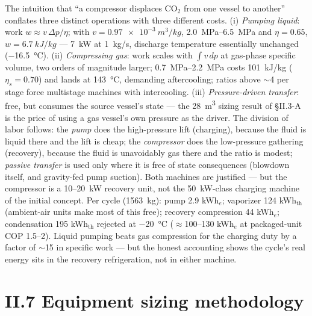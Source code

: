 The intuition that ``a compressor displaces CO$_2$ from one vessel to
another'' conflates three distinct operations with three different
costs. (i) \emph{Pumping liquid}: work
$w \approx v\,\Delta p/\eta$; with
$v = \SI{0.97e-3}{m^3/kg}$, \SIrange{2.0}{6.5}{MPa} and
$\eta = 0.65$, $w = \SI{6.7}{kJ/kg}$ --- \SI{7}{kW} at \SI{1}{kg/s},
discharge temperature essentially unchanged (\SI{-16.5}{\celsius}).
(ii) \emph{Compressing gas}: work scales with
$\int v\,dp$ at gas-phase specific volume, two orders of magnitude
larger; \SIrange{0.7}{2.2}{MPa} costs \SI{101}{kJ/kg}
($\eta_s = 0.70$) and lands at \SI{143}{\celsius}, demanding
aftercooling; ratios above $\sim$4 per stage force multistage
machines with intercooling. (iii) \emph{Pressure-driven transfer}:
free, but consumes the source vessel's state --- the \SI{28}{m^3}
sizing result of \S II.3-A is the price of using a gas vessel's own
pressure as the driver. The division of labor follows: the
\emph{pump} does the high-pressure lift (charging), because the fluid
is liquid there and the lift is cheap; the \emph{compressor} does the
low-pressure gathering (recovery), because the fluid is unavoidably
gas there and the ratio is modest; \emph{passive transfer} is used
only where it is free of state consequences (blowdown itself, and
gravity-fed pump suction). Both machines are justified --- but the
compressor is a \SI{10}{}--\SI{20}{kW} recovery unit, not the
\SI{50}{kW}-class charging machine of the initial concept. Per cycle
(\SI{1563}{kg}): pump 2.9 kWh$_{e}$; vaporizer
124 kWh$_{\mathrm{th}}$ (ambient-air units make most of this free);
recovery compression 44 kWh$_{e}$; condensation
195 kWh$_{\mathrm{th}}$ rejected at \SI{-20}{\celsius}
($\approx$100--130 kWh$_{e}$ at packaged-unit COP 1.5--2).
Liquid pumping beats gas compression for the charging duty by a
factor of $\sim$15 in specific work --- but the honest accounting
shows the cycle's real energy sits in the recovery refrigeration, not
in either machine.

\section{II.7 Equipment sizing methodology}

